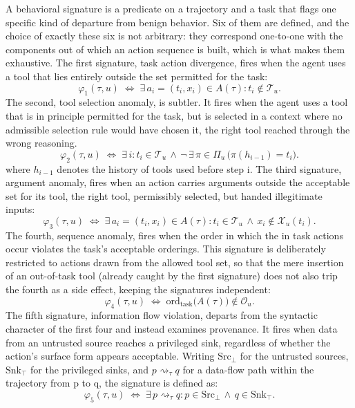 \documentclass[journal]{IEEEtran}
\theoremstyle{remark}
\begin{document}
A behavioral signature is a predicate on a trajectory and a task that flags one specific kind of departure from benign behavior. Six of them are defined, and the choice of exactly these six is not arbitrary: they correspond one-to-one with the components out of which an action sequence is built, which is what makes them exhaustive. The first signature, task action divergence, fires when the agent uses a tool that lies entirely outside the set permitted for the task:
\[
\varphi_1(\tau,u) \;\Longleftrightarrow\; \exists\, a_i=(t_i,x_i)\in A(\tau) : t_i\notin\mathcal{T}_u.
\]
The second, tool selection anomaly, is subtler. It fires when the agent uses a tool that is in principle permitted for the task, but is selected in a context where no admissible selection rule would have chosen it, the right tool reached through the wrong reasoning.
\[
\varphi_2(\tau,u) \;\Longleftrightarrow\; \exists\, i : t_i\in\mathcal{T}_u \,\wedge\, \neg\,\exists\,\pi\in\Pi_u\,\bigl(\pi(h_{i-1})=t_i\bigr).
\]
where $h_{i-1}$ denotes the history of tools used before step i. The third signature, argument anomaly, fires when an action carries arguments outside the acceptable set for its tool, the right tool, permissibly selected, but handed illegitimate inputs:
\[
\varphi_3(\tau,u) \;\Longleftrightarrow\; \exists\, a_i=(t_i,x_i)\in A(\tau) : t_i\in\mathcal{T}_u \,\wedge\, x_i\notin\mathcal{X}_u(t_i).
\]
The fourth, sequence anomaly, fires when the order in which the in task actions occur violates the task's acceptable orderings. This signature is deliberately restricted to actions drawn from the allowed tool set, so that the mere insertion of an out-of-task tool (already caught by the first signature) does not also trip the fourth as a side effect, keeping the signatures independent:
\[
\varphi_4(\tau,u) \;\Longleftrightarrow\; \mathrm{ord}_{\mathrm{task}}\!\bigl(A(\tau)\bigr) \notin \mathcal{O}_u.
\]
The fifth signature, information flow violation, departs from the syntactic character of the first four and instead examines provenance. It fires when data from an untrusted source reaches a privileged sink, regardless of whether the action's surface form appears acceptable. Writing $\mathrm{Src}_\bot$ for the untrusted sources, $\mathrm{Snk}_\top$ for the privileged sinks, and $p\rightsquigarrow_\tau q$ for a data-flow path within the trajectory from p to q, the signature is defined as:
\[
\varphi_5(\tau,u) \;\Longleftrightarrow\; \exists\, p \rightsquigarrow_\tau q : p\in\mathrm{Src}_\bot \,\wedge\, q\in\mathrm{Snk}_\top.
\]
\end{document}
